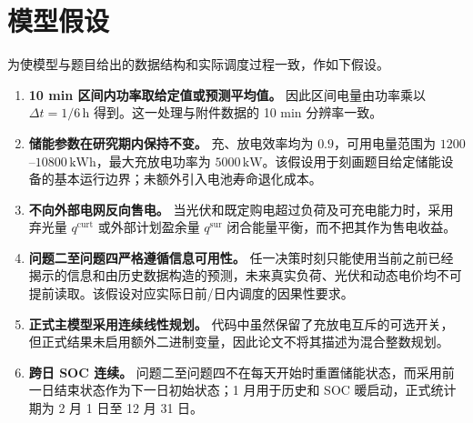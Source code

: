 \documentclass[withoutpreface]{cumcmthesis}
\newcommand{\dt}{\Delta t}
\newcommand{\qcurt}{q^{\mathrm{curt}}}
\newcommand{\qsur}{q^{\mathrm{sur}}}
\begin{document}
\section{模型假设}
为使模型与题目给出的数据结构和实际调度过程一致，作如下假设。
\begin{enumerate}
  \item \textbf{10 min 区间内功率取给定值或预测平均值。} 因此区间电量由功率乘以 $\dt=1/6\,\mathrm h$ 得到。这一处理与附件数据的 10 min 分辨率一致。
  \item \textbf{储能参数在研究期内保持不变。} 充、放电效率均为 $0.9$，可用电量范围为 $1200$--$10800\,\mathrm{kWh}$，最大充放电功率为 $5000\,\mathrm{kW}$。该假设用于刻画题目给定储能设备的基本运行边界；未额外引入电池寿命退化成本。
  \item \textbf{不向外部电网反向售电。} 当光伏和既定购电超过负荷及可充电能力时，采用弃光量 $\qcurt$ 或外部计划盈余量 $\qsur$ 闭合能量平衡，而不把其作为售电收益。
  \item \textbf{问题二至问题四严格遵循信息可用性。} 任一决策时刻只能使用当前之前已经揭示的信息和由历史数据构造的预测，未来真实负荷、光伏和动态电价均不可提前读取。该假设对应实际日前/日内调度的因果性要求。
  \item \textbf{正式主模型采用连续线性规划。} 代码中虽然保留了充放电互斥的可选开关，但正式结果未启用额外二进制变量，因此论文不将其描述为混合整数规划。
  \item \textbf{跨日 SOC 连续。} 问题二至问题四不在每天开始时重置储能状态，而采用前一日结束状态作为下一日初始状态；1 月用于历史和 SOC 暖启动，正式统计期为 2 月 1 日至 12 月 31 日。
\end{enumerate}
\end{document}
